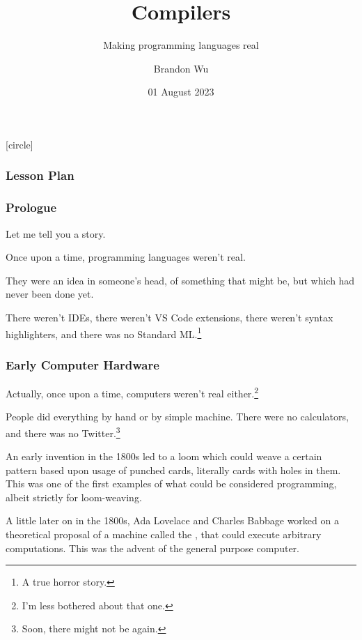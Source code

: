 \documentclass[aspectratio=169, handout]{beamer}
\title{Compilers} %
\subtitle{Making programming languages real} %
\date{01 August 2023} %
\author{Brandon Wu} %
\newif\ifcolorlambda
\begin{document}
\ifweb
    \renewcommand{\pause}{}
\fi

[circle]

{
\begin{frame}[plain]
    \colorlambdatrue
    \titlepage
\end{frame}
}

\begin{frame}[fragile]
  \frametitle{Lesson Plan}

  \tableofcontents
\end{frame}


\begin{frame}[fragile]
  \frametitle{Prologue}

  Let me tell you a story.

  \pause
  \vspace{\fill}

  Once upon a time, programming languages weren't real.

  \pause
  \vspace{\fill}

  They were an idea in someone's head, of something that might be, but
  which had never been done yet.

  \pause
  \vspace{\fill}

  There weren't IDEs, there weren't VS Code extensions, there weren't
  syntax highlighters, and there was no Standard ML.\footnote<4->{A true horror story.}
\end{frame}

\begin{frame}[fragile]
  \frametitle{Early Computer Hardware}

  Actually, once upon a time, computers weren't real either.\footnote<1->{I'm less bothered about that one.}

  \pause
  \vspace{\fill}

  People did everything by hand or by simple machine. There were no calculators,
  and there was no Twitter.\footnote<2->{Soon, there might not be again.}

  \pause
  \vspace{\fill}

  An early invention in the 1800s led to a loom which could weave a certain pattern
  based upon usage of punched cards, literally cards with holes in them. This was
  one of the first examples of what could be considered programming, albeit
  strictly for loom-weaving.

  \pause
  \vspace{\fill}

  A little later on in the 1800s, Ada Lovelace and Charles Babbage worked on a
  theoretical proposal of a machine called the , that
  could execute arbitrary computations. This was the advent of the general
  purpose computer.
\end{frame}
\end{document}
